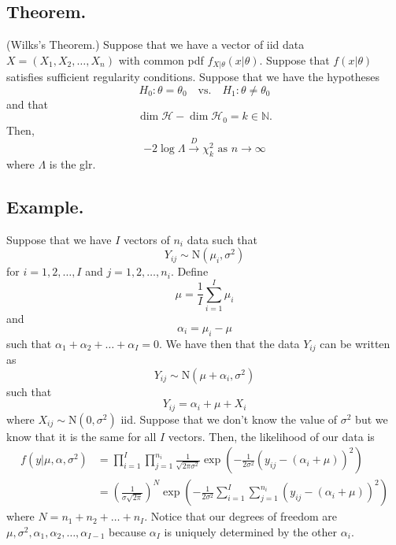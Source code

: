 \documentclass[titlepage]{article}
\begin{document}
\subsection{Theorem.} (Wilks's Theorem.) Suppose that we have a vector of iid data $X = (X_{1}, X_{2}, \ldots, X_{n})$ with common pdf $f_{X|\theta}(x|\theta)$. Suppose that $f(x|\theta)$ satisfies sufficient regularity conditions. Suppose that
we have the hypotheses 
$$H_{0}: \theta = \theta_{0} \quad \text{vs.} \quad H_{1}: \theta \neq \theta_{0}$$
and that 
$$\dim \mathcal{H} - \dim \mathcal{H}_{0} = k \in \mathbb{N}.$$
Then, 
$$-2\log\Lambda \xrightarrow{D} \chi_{k}^{2} \text{ as } n \to \infty$$
where $\Lambda$ is the glr.

\subsection{Example.} Suppose that we have $I$ vectors of $n_{i}$ data such that 
$$Y_{ij} \sim \text{N}(\mu_{i}, \sigma^{2})$$
for $i = 1, 2, \ldots, I$ and $j = 1, 2, \ldots, n_{i}$. Define 
$$\mu = \frac{1}{I}\sum_{i=1}^{I}\mu_{i}$$
and 
$$\alpha_{i} = \mu_{i} - \mu$$
such that $\alpha_{1} + \alpha_{2} + \ldots + \alpha_{I} = 0$. We have then that the data $Y_{ij}$ can be written as
$$Y_{ij} \sim \text{N}(\mu + \alpha_{i}, \sigma^{2})$$
such that 
$$Y_{ij} = \alpha_{i} + \mu + X_{i}$$
where $X_{ij} \sim \text{N}(0, \sigma^{2})$ iid. Suppose that we don't know the value of $\sigma^{2}$ but we know that it is the same for all $I$ vectors. Then, the likelihood of our data is 
\begin{align*}
    f(y|\mu, \alpha, \sigma^{2}) &= \prod_{i=1}^{I}\prod_{j=1}^{n_{i}}\frac{1}{\sqrt{2\pi\sigma^{2}}}\exp\left(-\frac{1}{2\sigma^{2}}(y_{ij} - (\alpha_{i} + \mu))^{2}\right) \\
                                 &= \left(\frac{1}{\sigma\sqrt{2\pi}}\right)^{N}\exp\left(-\frac{1}{2\sigma^{2}}\sum_{i=1}^{I}\sum_{j=1}^{n_{i}}(y_{ij} - (\alpha_{i} + \mu))^{2}\right)
\end{align*}
where $N = n_{1} + n_{2} + \ldots + n_{I}$. Notice that our degrees of freedom are $\mu, \sigma^{2}, \alpha_{1}, \alpha_{2}, \ldots, \alpha_{I-1}$ because $\alpha_{I}$ is uniquely determined by the other $\alpha_{i}$.
\end{document}
